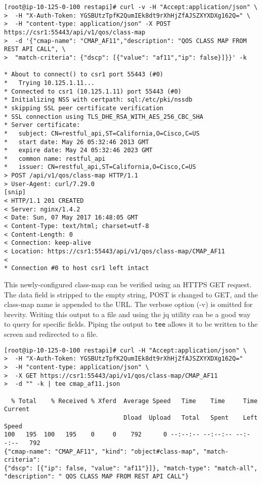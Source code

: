 \begin{verbatim}
[root@ip-10-125-0-100 restapi]# curl -v -H "Accept:application/json" \
>  -H "X-Auth-Token: YGSBUtzTpfK2QumIEk8dt9rXhHjZfAJSZXYXDXg162Q=" \
>  -H "content-type: application/json" -X POST https://csr1:55443/api/v1/qos/class-map
>  -d '{"cmap-name": "CMAP_AF11","description": "QOS CLASS MAP FROM REST API CALL", \
>  "match-criteria": {"dscp": [{"value": "af11","ip": false}]}}' -k

* About to connect() to csr1 port 55443 (#0)
*   Trying 10.125.1.11...
* Connected to csr1 (10.125.1.11) port 55443 (#0)
* Initializing NSS with certpath: sql:/etc/pki/nssdb
* skipping SSL peer certificate verification
* SSL connection using TLS_DHE_RSA_WITH_AES_256_CBC_SHA
* Server certificate:
* 	subject: CN=restful_api,ST=California,O=Cisco,C=US
* 	start date: May 26 05:32:46 2013 GMT
* 	expire date: May 24 05:32:46 2023 GMT
* 	common name: restful_api
* 	issuer: CN=restful_api,ST=California,O=Cisco,C=US
> POST /api/v1/qos/class-map HTTP/1.1
> User-Agent: curl/7.29.0
[snip]
< HTTP/1.1 201 CREATED
< Server: nginx/1.4.2
< Date: Sun, 07 May 2017 16:48:05 GMT
< Content-Type: text/html; charset=utf-8
< Content-Length: 0
< Connection: keep-alive
< Location: https://csr1:55443/api/v1/qos/class-map/CMAP_AF11
< 
* Connection #0 to host csr1 left intact
\end{verbatim}

This newly-configured class-map can be verified using an HTTPS GET request.
The data field is stripped to the empty string, POST is changed to GET, and
the class-map name is appended to the URL. The verbose option (-v) is omitted
for brevity. Writing this output to a file and using the jq utility can be a
good way to query for specific fields. Piping the output to \verb|tee| allows
it to be written to the screen and redirected to a file.

\begin{verbatim}
[root@ip-10-125-0-100 restapi]# curl -H "Accept:application/json" \
>  -H "X-Auth-Token: YGSBUtzTpfK2QumIEk8dt9rXhHjZfAJSZXYXDXg162Q="
>  -H "content-type: application/json" \
>  -X GET https://csr1:55443/api/v1/qos/class-map/CMAP_AF11
>  -d "" -k | tee cmap_af11.json

  % Total    % Received % Xferd  Average Speed   Time    Time     Time  Current
                                 Dload  Upload   Total   Spent    Left  Speed
100   195  100   195    0     0    792      0 --:--:-- --:--:-- --:--:--   792
{"cmap-name": "CMAP_AF11", "kind": "object#class-map", "match-criteria":
{"dscp": [{"ip": false, "value": "af11"}]}, "match-type": "match-all",
"description": " QOS CLASS MAP FROM REST API CALL"}
\end{verbatim}

